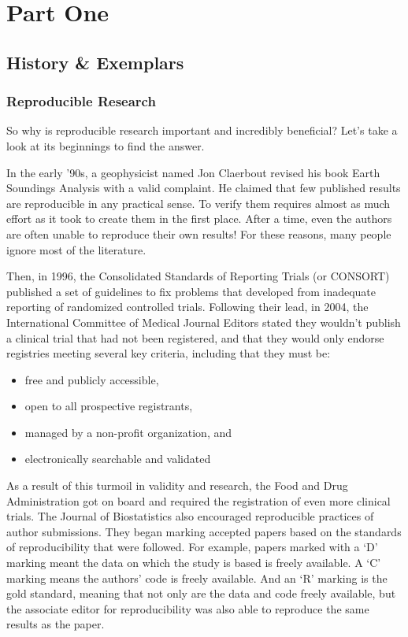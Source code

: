 \documentclass[]{book}
\providecommand{\tightlist}{%
  \setlength{\itemsep}{0pt}\setlength{\parskip}{0pt}}
\theoremstyle{definition}
\theoremstyle{definition}
\theoremstyle{definition}
\theoremstyle{remark}
\begin{document}
\part{Part One}\label{part-part-one}

\chapter{History \& Exemplars}\label{history}

\section{Reproducible Research}\label{reproducible-research}

So why is reproducible research important and incredibly beneficial?
Let's take a look at its beginnings to find the answer.

In the early '90s, a geophysicist named Jon Claerbout revised his book
Earth Soundings Analysis with a valid complaint. He claimed that few
published results are reproducible in any practical sense. To verify
them requires almost as much effort as it took to create them in the
first place. After a time, even the authors are often unable to
reproduce their own results! For these reasons, many people ignore most
of the literature.

Then, in 1996, the Consolidated Standards of Reporting Trials (or
CONSORT) published a set of guidelines to fix problems that developed
from inadequate reporting of randomized controlled trials. Following
their lead, in 2004, the International Committee of Medical Journal
Editors stated they wouldn't publish a clinical trial that had not been
registered, and that they would only endorse registries meeting several
key criteria, including that they must be:

\begin{itemize}
\tightlist
\item
  free and publicly accessible,
\item
  open to all prospective registrants,
\item
  managed by a non-profit organization, and
\item
  electronically searchable and validated
\end{itemize}

As a result of this turmoil in validity and research, the Food and Drug
Administration got on board and required the registration of even more
clinical trials. The Journal of Biostatistics also encouraged
reproducible practices of author submissions. They began marking
accepted papers based on the standards of reproducibility that were
followed. For example, papers marked with a `D' marking meant the data
on which the study is based is freely available. A `C' marking means the
authors' code is freely available. And an `R' marking is the gold
standard, meaning that not only are the data and code freely available,
but the associate editor for reproducibility was also able to reproduce
the same results as the paper.
\end{document}
